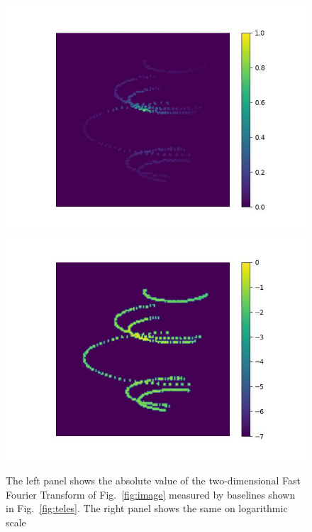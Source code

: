 \begin{figure}
  \includegraphics[width=.49\linewidth]{fig/ft/ft_base.jpg}\hfil
  \includegraphics[width=.49\linewidth]{fig/ft/ft_log_base.jpg}
  \caption{The left panel shows the absolute value of the two-dimensional Fast Fourier Transform of Fig.~\ref{fig:image} measured by baselines shown in Fig.~\ref{fig:teles}. The right panel shows the same on logarithmic scale}
	\label{fig:ft_base}
\end{figure}

